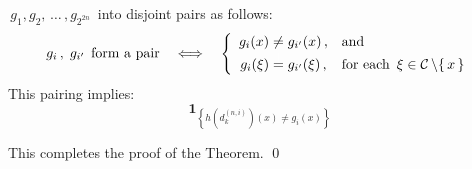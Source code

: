 \,$g_{1}, g_{2}, \,\ldots\,, g_{2^{2n}}$\, into disjoint pairs as follows:
\begin{equation*}
g_{i}\,,\; g_{i^{\prime}} \,\;\textnormal{form a pair}
\quad\Longleftrightarrow\quad
\left\{\begin{array}{cl}
	g_{i}(x) \neq g_{i^{\prime}}(x)\,, & \textnormal{and}
	\\
	g_{i}(\xi) \overset{{\color{white}\vert}}{=} g_{i^{\prime}}(\xi)\,, & \textnormal{for each \,$\xi \in \mathcal{C}\,\backslash\{\,x\,\}$}
	\end{array}\right.
\end{equation*}
This pairing implies:
\begin{equation*}
\mathbf{1}_{\left\{h(d^{(n,i)}_{k})(x) \neq g_{i}(x)\right\}}
\end{equation*}


\vskip 5.0cm
\noindent
This completes the proof of the Theorem.
\qed



\renewcommand{\theenumi}{\roman{enumi}}
\renewcommand{\labelenumi}{\textnormal{(\theenumi)}$\;\;$}

